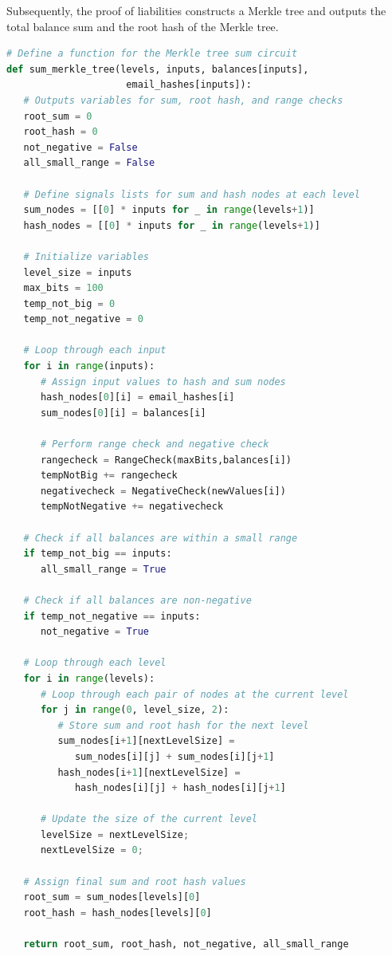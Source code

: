 Subsequently, the proof of liabilities constructs a Merkle tree and outputs the total balance sum and the root hash of the Merkle tree.

\begin{lstlisting}[language=Python, caption=Liabilities circuit pseudocode]
# Define a function for the Merkle tree sum circuit
def sum_merkle_tree(levels, inputs, balances[inputs], 
                     email_hashes[inputs]):
   # Outputs variables for sum, root hash, and range checks
   root_sum = 0
   root_hash = 0
   not_negative = False
   all_small_range = False

   # Define signals lists for sum and hash nodes at each level
   sum_nodes = [[0] * inputs for _ in range(levels+1)]
   hash_nodes = [[0] * inputs for _ in range(levels+1)]

   # Initialize variables
   level_size = inputs
   max_bits = 100
   temp_not_big = 0
   temp_not_negative = 0

   # Loop through each input
   for i in range(inputs):
      # Assign input values to hash and sum nodes
      hash_nodes[0][i] = email_hashes[i]
      sum_nodes[0][i] = balances[i]

      # Perform range check and negative check
      rangecheck = RangeCheck(maxBits,balances[i])
      tempNotBig += rangecheck
      negativecheck = NegativeCheck(newValues[i])
      tempNotNegative += negativecheck

   # Check if all balances are within a small range
   if temp_not_big == inputs:
      all_small_range = True

   # Check if all balances are non-negative
   if temp_not_negative == inputs:
      not_negative = True

   # Loop through each level
   for i in range(levels):
      # Loop through each pair of nodes at the current level
      for j in range(0, level_size, 2):
         # Store sum and root hash for the next level
         sum_nodes[i+1][nextLevelSize] = 
            sum_nodes[i][j] + sum_nodes[i][j+1]
         hash_nodes[i+1][nextLevelSize] = 
            hash_nodes[i][j] + hash_nodes[i][j+1]

      # Update the size of the current level
      levelSize = nextLevelSize;
      nextLevelSize = 0;

   # Assign final sum and root hash values
   root_sum = sum_nodes[levels][0]
   root_hash = hash_nodes[levels][0]

   return root_sum, root_hash, not_negative, all_small_range

\end{lstlisting}

